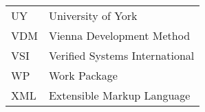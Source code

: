 \begin{longtable}{ll}
UY      & University of York\\
VDM     &Vienna Development Method\\
VSI     & Verified Systems International\\
WP	&Work Package\\
XML	&Extensible Markup Language\\
\end{longtable}
